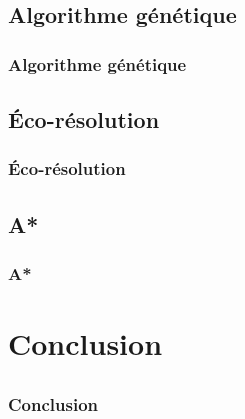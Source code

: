 \documentclass{beamer}
\begin{document}
        \subsection{Algorithme génétique}
            \begin{frame}
                \frametitle{Algorithme génétique}
            \end{frame}
        \subsection{Éco-résolution}
            \begin{frame}
                \frametitle{Éco-résolution}
            \end{frame}
        \subsection{A*}
            \begin{frame}
                \frametitle{A*}
            \end{frame}

    \section{Conclusion}
        \subsection{}
            \begin{frame}
                \frametitle{Conclusion}
            \end{frame}
\end{document}
